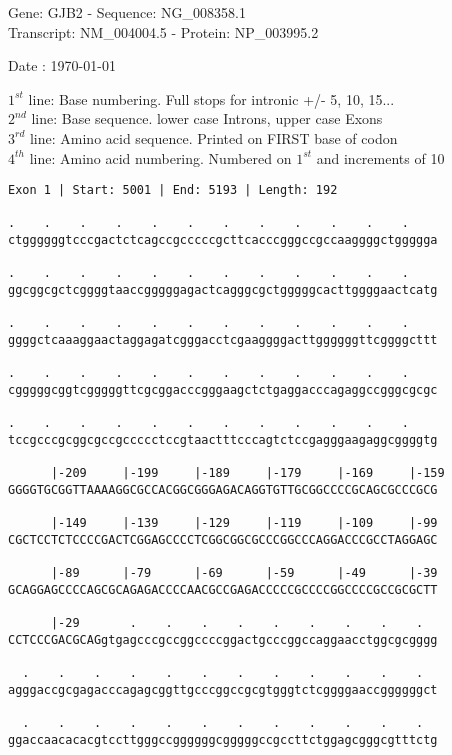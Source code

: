\documentclass{article}
\begin{document}
\begin{center}
\begin{large}
Gene: GJB2 - Sequence: NG\_008358.1\\
Transcript: NM\_004004.5 - Protein: NP\_003995.2
 
 Date : \today
\end{large}
\end{center}
$1^{st}$ line: Base numbering. Full stops for intronic +/- 5, 10, 15...\\
$2^{nd}$ line: Base sequence. lower case Introns, upper case Exons\\
$3^{rd}$ line: Amino acid sequence. Printed on FIRST base of codon\\
$4^{th}$ line: Amino acid numbering. Numbered on $1^{st}$ and increments of 10\\
\begin{Verbatim}[fontfamily=courier]
Exon 1 | Start: 5001 | End: 5193 | Length: 192

.    .    .    .    .    .    .    .    .    .    .    .    
ctggggggtcccgactctcagccgcccccgcttcacccgggccgccaaggggctggggga

.    .    .    .    .    .    .    .    .    .    .    .    
ggcggcgctcggggtaaccgggggagactcagggcgctgggggcacttggggaactcatg

.    .    .    .    .    .    .    .    .    .    .    .    
ggggctcaaaggaactaggagatcgggacctcgaaggggacttggggggttcggggcttt

.    .    .    .    .    .    .    .    .    .    .    .    
cgggggcggtcgggggttcgcggacccgggaagctctgaggacccagaggccgggcgcgc

.    .    .    .    .    .    .    .    .    .    .    .    
tccgcccgcggcgccgccccctccgtaactttcccagtctccgagggaagaggcggggtg

      |-209     |-199     |-189     |-179     |-169     |-159
GGGGTGCGGTTAAAAGGCGCCACGGCGGGAGACAGGTGTTGCGGCCCCGCAGCGCCCGCG

      |-149     |-139     |-129     |-119     |-109     |-99
CGCTCCTCTCCCCGACTCGGAGCCCCTCGGCGGCGCCCGGCCCAGGACCCGCCTAGGAGC

      |-89      |-79      |-69      |-59      |-49      |-39
GCAGGAGCCCCAGCGCAGAGACCCCAACGCCGAGACCCCCGCCCCGGCCCCGCCGCGCTT

      |-29       .    .    .    .    .    .    .    .    .  
CCTCCCGACGCAGgtgagcccgccggccccggactgcccggccaggaacctggcgcgggg

  .    .    .    .    .    .    .    .    .    .    .    .  
agggaccgcgagacccagagcggttgcccggccgcgtgggtctcggggaaccggggggct

  .    .    .    .    .    .    .    .    .    .    .    .  
ggaccaacacacgtccttgggccggggggcgggggccgccttctggagcgggcgtttctg

\end{Verbatim}
\end{document}

